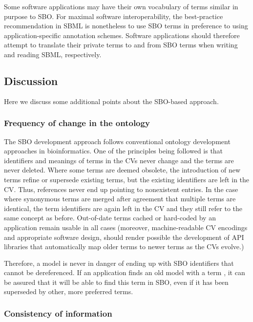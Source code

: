 Some software applications may have their own vocabulary of terms
similar in purpose to SBO.  For maximal software interoperability,
the best-practice recommendation in SBML is nonetheless to use SBO
terms in preference to using application-specific annotation
schemes.  Software applications should therefore attempt to
translate their private terms to and from SBO terms when writing
and reading SBML, respectively.

\subsection{Discussion}

Here we discuss some additional points about the SBO-based
approach.

\subsubsection{Frequency of change in the ontology}
\label{sec:sbo-frequency-of-change}

The SBO development approach follows conventional ontology
development approaches in bioinformatics.  One of the principles
being followed is that identifiers and meanings of terms in the
CVs never change and the terms are never deleted.  Where some
terms are deemed obsolete, the introduction of new terms refine or
supersede existing terms, but the existing identifiers are left in
the CV.  Thus, references never end up pointing to nonexistent
entries.  In the case where synonymous terms are merged after
agreement that multiple terms are identical, the term identifiers
are again left in the CV and they still refer to the same concept
as before.  Out-of-date terms cached or hard-coded by an
application remain usable in all cases (moreover, 
machine-readable CV encodings and appropriate software design,
should render possible the development of API libraries that automatically map
older terms to newer terms as the CVs evolve.)

Therefore, a model is never in danger of ending up with SBO
identifiers that cannot be dereferenced.  If an application finds
an old model with a term , it can be assured
that it will be able to find this term in SBO, even if it has been
superseded by other, more preferred terms.

\subsubsection{Consistency of information}


